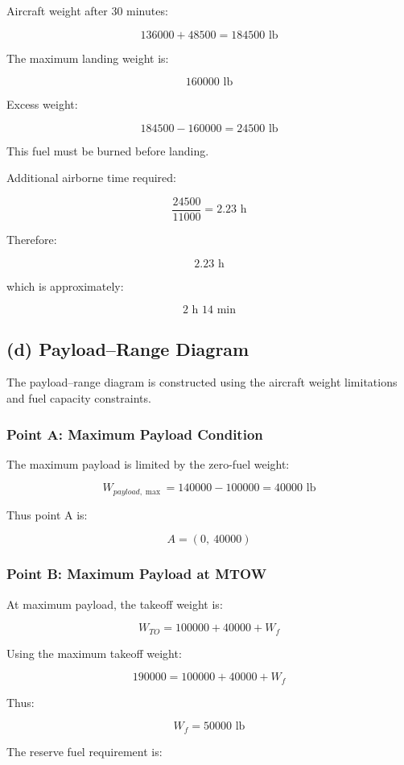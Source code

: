 \documentclass{KPS_assignment}
\begin{document}
Aircraft weight after 30 minutes:

\[
136000 + 48500 = 184500 \text{ lb}
\]

The maximum landing weight is:

\[
160000 \text{ lb}
\]

Excess weight:

\[
184500 - 160000 = 24500 \text{ lb}
\]

This fuel must be burned before landing.

Additional airborne time required:

\[
\frac{24500}{11000}
=
2.23 \text{ h}
\]

Therefore:

\[
\boxed{2.23 \text{ h}}
\]

which is approximately:

\[
\boxed{2 \text{ h } 14 \text{ min}}
\]
\subsection*{(d) Payload--Range Diagram}

The payload--range diagram is constructed using the aircraft weight limitations and fuel capacity constraints.

\subsubsection*{Point A: Maximum Payload Condition}

The maximum payload is limited by the zero-fuel weight:

\[
W_{payload,\max}
=
140000-100000
=
40000 \text{ lb}
\]

Thus point A is:

\[
A=(0,\ 40000)
\]

\subsubsection*{Point B: Maximum Payload at MTOW}

At maximum payload, the takeoff weight is:

\[
W_{TO}
=
100000+40000+W_f
\]

Using the maximum takeoff weight:

\[
190000
=
100000+40000+W_f
\]

Thus:

\[
W_f
=
50000 \text{ lb}
\]

The reserve fuel requirement is:
\end{document}
